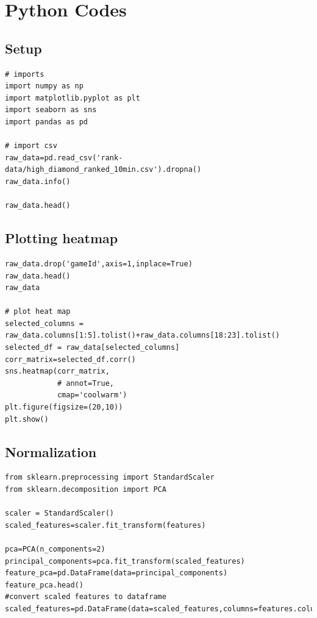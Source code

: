 \documentclass[stu,12pt,floatsintext]{apa7}
\begin{document}
\section{Python Codes}
\label{sec:python-codes}
\subsection{Setup}
\begin{lstlisting}[style=pythonstyle]
# imports
import numpy as np
import matplotlib.pyplot as plt
import seaborn as sns
import pandas as pd

# import csv
raw_data=pd.read_csv('rank-data/high_diamond_ranked_10min.csv').dropna()
raw_data.info()

raw_data.head()
\end{lstlisting}

\subsection{Plotting heatmap}
\begin{lstlisting}[style=pythonstyle]
raw_data.drop('gameId',axis=1,inplace=True)
raw_data.head()
raw_data

# plot heat map
selected_columns = raw_data.columns[1:5].tolist()+raw_data.columns[18:23].tolist()
selected_df = raw_data[selected_columns]
corr_matrix=selected_df.corr()
sns.heatmap(corr_matrix,
            # annot=True,
            cmap='coolwarm')
plt.figure(figsize=(20,10))
plt.show()
\end{lstlisting}

\subsection{Normalization}
\begin{lstlisting}[style=pythonstyle]
from sklearn.preprocessing import StandardScaler
from sklearn.decomposition import PCA

scaler = StandardScaler()
scaled_features=scaler.fit_transform(features)

pca=PCA(n_components=2)
principal_components=pca.fit_transform(scaled_features)
feature_pca=pd.DataFrame(data=principal_components)
feature_pca.head()
#convert scaled features to dataframe
scaled_features=pd.DataFrame(data=scaled_features,columns=features.columns)
\end{lstlisting}
\end{document}
